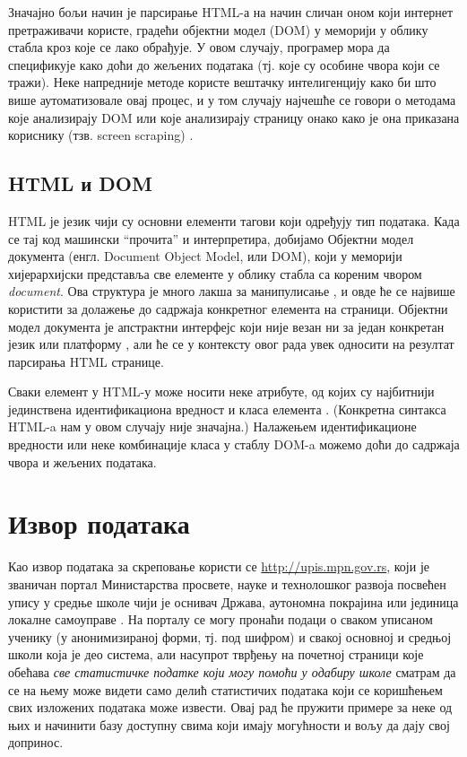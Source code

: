 Значајно бољи начин је парсирање HTML-а на начин сличан оном који интернет претраживачи користе, градећи објектни модел (DOM) у меморији у облику стабла кроз које се лако обрађује. У овом случају, програмер мора да спецификује како доћи до жељених података (тј. које су особине чвора који се тражи). Неке напредније методе користе вештачку интелигенцију како би што више аутоматизовале овај процес, и у том случају најчешће се говори о методама које анализирају DOM \citep{peters2013content} или које анализирају страницу онако како је она приказана кориснику (тзв. screen scraping) \citep{awsdiffbot}.

\subsection{HTML и DOM}

HTML је језик чији су основни елементи тагови који одређују тип података. Када се тај код машински \enquote{прочита} и интерпретира, добијамо Објектни модел документа (енгл. Document Object Model, или DOM), који у меморији хијерархијски представља све елементе у облику стабла са кореним чвором \emph{document}. Ова структура је много лакша за манипулисање \citep{gupta2003dom}, и овде ће се највише користити за долажење до садржаја конкретног елемента на страници. Објектни модел документа је апстрактни интерфејс који није везан ни за један конкретан језик или платформу \citep{w3domdef}, али ће се у контексту овог рада увек односити на резултат парсирања HTML странице. 

Сваки елемент у HTML-у може носити неке атрибуте, од којих су најбитнији јединствена идентификациона вредност  и класа елемента . (Конкретна синтакса HTML-a нам у овом случају није значајна.) Налажењем идентификационе вредности или неке комбинације класа у стаблу DOM-a можемо доћи до садржаја чвора и жељених података.


\section{Извор података}

Као извор података за скреповање користи се \url{http://upis.mpn.gov.rs}, који је званичан портал Министарства просвете, науке и технолошког развоја посвећен упису у средње школе чији је оснивач Држава, аутономна покрајина или јединица локалне самоуправе \citep{upismpn}. На порталу се могу пронаћи подаци о сваком уписаном ученику (у анонимизираној форми, тј. под шифром) и свакој основној и средњој школи која је део система, али насупрот тврђењу на почетној страници које обећава \emph{све статистичке податке који могу помоћи у одабиру школе} \citep{upismpn} сматрам да се на њему може видети само делић статистичих података који се коришћењем свих изложених података може извести. Овај рад ће пружити примере за неке од њих и начинити базу доступну свима који имају могућности и вољу да дају свој допринос.

